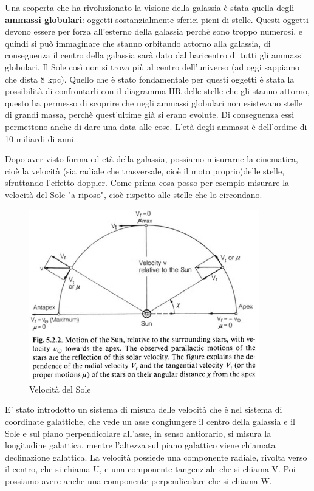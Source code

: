 \documentclass[a4paper,11pt]{article}
\begin{document}
Una scoperta che ha rivoluzionato la visione della galassia è stata quella degli \textbf{ammassi globulari}: oggetti sostanzialmente sferici pieni di stelle. Questi oggetti devono essere per forza all'esterno della galassia perchè sono troppo numerosi, e quindi si può immaginare che stanno orbitando attorno alla galassia, di conseguenza il centro della galassia sarà dato dal baricentro di tutti gli ammassi globulari. Il Sole così non si trova più al centro dell'universo (ad oggi sappiamo che dista 8 kpc). Quello che è stato fondamentale per questi oggetti è stata la possibilità di confrontarli con il diagramma HR delle stelle che gli stanno attorno, questo ha permesso di scoprire che negli ammassi globulari non esistevano stelle di grandi massa, perchè quest'ultime già si erano evolute. Di conseguenza essi permettono anche di dare una data alle cose. L'età degli ammassi è dell'ordine di 10 miliardi di anni.

Dopo aver visto forma ed età della galassia, possiamo misurarne la cinematica, cioè la velocità (sia radiale che trasversale, cioè il moto proprio)delle stelle, sfruttando l'effetto doppler. Come prima cosa posso per esempio misurare la velocità del Sole "a riposo", cioè rispetto alle stelle che lo circondano. 
\begin{figure}[h!!]
        \centering
        \includegraphics[width=10cm]{Velocita del Sole.JPG}
        \caption{Velocità del Sole}
        \label{fig:Correnti parassite}
    \end{figure}

E' stato introdotto un sistema di misura delle velocità che è nel sistema di coordinate galattiche, che vede un asse congiungere il centro della galassia e il Sole e sul piano perpendicolare all'asse, in senso antiorario, si misura la longitudine galattica, mentre l'altezza sul piano galattico viene chiamata declinazione galattica. La velocità possiede una componente radiale, rivolta verso il centro, che si chiama U, e una componente tangenziale che si chiama V. Poi possiamo avere anche una componente perpendicolare che si chiama W.
\end{document}
